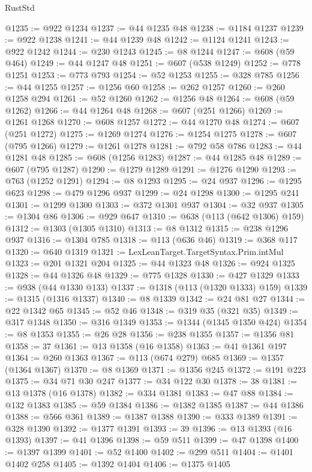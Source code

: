 \begin{lexlean}{RustStd}
\begin{coremodule}
@1235 := @922 @1234
@1237 := @44 @1235 @48
@1238 := @1184 @1237
@1239 := @922 @1238
@1241 := @44 @1239 @48
@1242 := @1124 @1241
@1243 := @922 @1242
@1244 := @230 @1243
@1245 := @8 @1244
@1247 := @608 (@59 @464)
@1249 := @44 @1247 @48
@1251 := @607 (@538 @1249)
@1252 := @778 @1251
@1253 := @773 @793
@1254 := @52 @1253
@1255 := @328 @785
@1256 := @44 @1255
@1257 := @1256 @60
@1258 := @262 @1257
@1260 := @260 @1258 @294
@1261 := @52 @1260
@1262 := @1256 @48
@1264 := @608 (@59 @1262)
@1266 := @44 @1264 @48
@1268 := @607 (@251 @1266)
@1269 := @1261 @1268
@1270 := @608 @1257
@1272 := @44 @1270 @48
@1274 := @607 (@251 @1272)
@1275 := @1269 @1274
@1276 := @1254 @1275
@1278 := @607 (@795 @1266)
@1279 := @1261 @1278
@1281 := @792 @58 @786
@1283 := @44 @1281 @48
@1285 := @608 (@1256 @1283)
@1287 := @44 @1285 @48
@1289 := @607 (@795 @1287)
@1290 := @1279 @1289
@1291 := @1276 @1290
@1293 := @763 (@1252 @1291)
@1294 := @8 @1293
@1295 := @24 @937
@1296 := @1295 @623
@1298 := @479 @1296 @937
@1299 := @24 @1298
@1300 := @1295 @241
@1301 := @1299 @1300
@1303 := @372 @1301 @937
@1304 := @32 @937
@1305 := @1304 @86
@1306 := @929 @647
@1310 := @638 (@113 (@642 @1306) @159)
@1312 := @1303 (@1305 @1310)
@1313 := @8 @1312
@1315 := @238 @1296 @937
@1316 := @1304 @785
@1318 := @113 (@636 @46)
@1319 := @368 @117
@1320 := @640 @1319
@1321 := LexLeanTarget.TargetSyntax.Prim.intMul
@1323 := @201 @1321 @204
@1325 := @44 @1323 @48
@1326 := @924 @1325
@1328 := @44 @1326 @48
@1329 := @775 @1328
@1330 := @427 @1329
@1333 := @938 (@44 @1330 @133)
@1337 := @1318 (@113 (@1320 @1333) @159)
@1339 := @1315 (@1316 @1337)
@1340 := @8 @1339
@1342 := @24 @81 @27
@1344 := @22 @1342 @65
@1345 := @52 @46
@1348 := @319 @35 (@321 @35)
@1349 := @317 @1348
@1350 := @316 @1349
@1353 := @1344 (@1345 @1350 @424)
@1354 := @8 @1353
@1355 := @26 @28
@1356 := @238 @1355
@1357 := @1356 @81
@1358 := 37
@1361 := @13 @1358 (@16 @1358)
@1363 := @41 @1361 @197
@1364 := @260 @1363
@1367 := @113 (@674 @279) @685
@1369 := @1357 (@1364 @1367)
@1370 := @8 @1369
@1371 := @1356 @245
@1372 := @191 @223
@1375 := @34 @71 @30 @247
@1377 := @34 @122 @30
@1378 := 38
@1381 := @13 @1378 (@16 @1378)
@1382 := @334 @1381
@1383 := @47 @88
@1384 := @132 @1383
@1385 := @59 @1384
@1386 := @1382 @1385
@1387 := @44 @1386
@1388 := @566 @361
@1389 := @1387 @1388
@1390 := @333 @1389
@1391 := @328 @1390
@1392 := @1377 @1391
@1393 := 39
@1396 := @13 @1393 (@16 @1393)
@1397 := @41 @1396
@1398 := @59 @511
@1399 := @47 @1398
@1400 := @1397 @1399
@1401 := @52 @1400
@1402 := @299 @511
@1404 := @1401 @1402 @258
@1405 := @1392 @1404
@1406 := @1375 @1405

\end{coremodule}
\end{lexlean}
